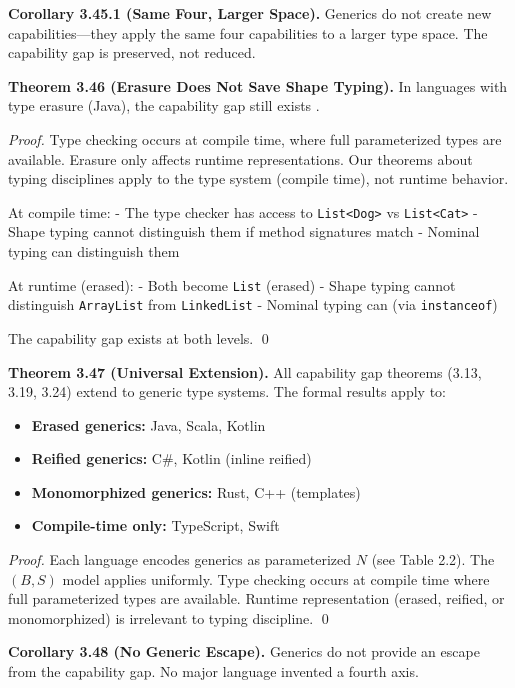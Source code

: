 \textbf{Corollary 3.45.1 (Same Four, Larger Space).} Generics do not
create new capabilities---they apply the same four capabilities to a
larger type space. The capability gap is preserved, not reduced.

\textbf{Theorem 3.46 (Erasure Does Not Save Shape Typing).} In languages
with type erasure (Java), the capability gap still exists
\cite{jlsErasure}.

\emph{Proof.} Type checking occurs at compile time, where full
parameterized types are available. Erasure only affects runtime
representations. Our theorems about typing disciplines apply to the type
system (compile time), not runtime behavior.

At compile time: - The type checker has access to
\texttt{List\textless{}Dog\textgreater{}} vs
\texttt{List\textless{}Cat\textgreater{}} - Shape typing cannot
distinguish them if method signatures match - Nominal typing can
distinguish them

At runtime (erased): - Both become \texttt{List} (erased) - Shape typing
cannot distinguish \texttt{ArrayList} from \texttt{LinkedList} - Nominal
typing can (via \texttt{instanceof})

The capability gap exists at both levels. \qed

\textbf{Theorem 3.47 (Universal Extension).} All capability gap theorems
(3.13, 3.19, 3.24) extend to generic type systems. The formal results
apply to:

\begin{itemize}
\tightlist
\item
  \textbf{Erased generics:} Java, Scala, Kotlin
\item
  \textbf{Reified generics:} C\#, Kotlin (inline reified)
\item
  \textbf{Monomorphized generics:} Rust, C++ (templates)
\item
  \textbf{Compile-time only:} TypeScript, Swift
\end{itemize}

\emph{Proof.} Each language encodes generics as parameterized \(N\) (see
Table 2.2). The \((B, S)\) model applies uniformly. Type checking
occurs at compile time where full parameterized types are available.
Runtime representation (erased, reified, or monomorphized) is irrelevant
to typing discipline. \qed

\textbf{Corollary 3.48 (No Generic Escape).} Generics do not provide an
escape from the capability gap. No major language invented a fourth
axis.

